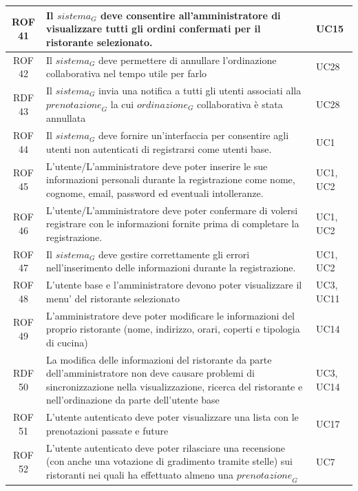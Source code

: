 \documentclass[12pt, oneside]{article}
\begin{document}
\begin{longtable}{|c|p{14cm}|p{2cm}|}
    \hline
    ROF 41 & Il $\textit{sistema}_G$ deve consentire all'amministratore di visualizzare tutti gli ordini confermati per il ristorante selezionato. & UC15 \\
    \hline
    ROF 42 & Il $\textit{sistema}_G$ deve permettere di annullare l'ordinazione collaborativa nel tempo utile per farlo & UC28 \\
    \hline
    RDF 43 & Il $\textit{sistema}_G$ invia una notifica a tutti gli utenti associati alla $\textit{prenotazione}_G$ la cui $\textit{ordinazione}_G$ collaborativa è stata annullata & UC28 \\
    \hline
    ROF 44 & Il $\textit{sistema}_G$ deve fornire un'interfaccia per consentire agli utenti non autenticati di registrarsi come utenti base. & UC1 \\
    \hline
    ROF 45 & L'utente/L'amministratore deve poter inserire le sue informazioni personali durante la registrazione come nome, cognome, email, password ed eventuali intolleranze. & UC1, UC2 \\
    \hline
    ROF 46 & L'utente/L'amministratore deve poter confermare di volersi registrare con le informazioni fornite prima di completare la registrazione. & UC1, UC2 \\
    \hline
    ROF 47 & Il $\textit{sistema}_G$ deve gestire correttamente gli errori nell'inserimento delle informazioni durante la registrazione. & UC1, UC2 \\
    \hline 
    ROF 48 & L'utente base e l'amministratore devono poter visualizzare il menu' del ristorante selezionato & UC3, UC11\\
    \hline
    ROF 49 & L'amministratore deve poter modificare le informazioni del proprio ristorante (nome, indirizzo, orari, coperti e tipologia di cucina) & UC14\\
    \hline
    RDF 50 & La modifica delle informazioni del ristorante da parte dell'amministratore non deve causare problemi di sincronizzazione nella visualizzazione, ricerca del ristorante e nell'ordinazione da parte dell'utente base & UC3, UC14 \\
    \hline
    ROF 51 & L'utente autenticato deve poter visualizzare una lista con le prenotazioni passate e future & UC17 \\
    \hline
    ROF 52 & L'utente autenticato deve poter rilasciare una recensione (con anche una votazione di gradimento tramite stelle) sui ristoranti nei quali ha effettuato almeno una $\textit{prenotazione}_G$ & UC7 \\
    \hline

\end{longtable}
\end{document}
